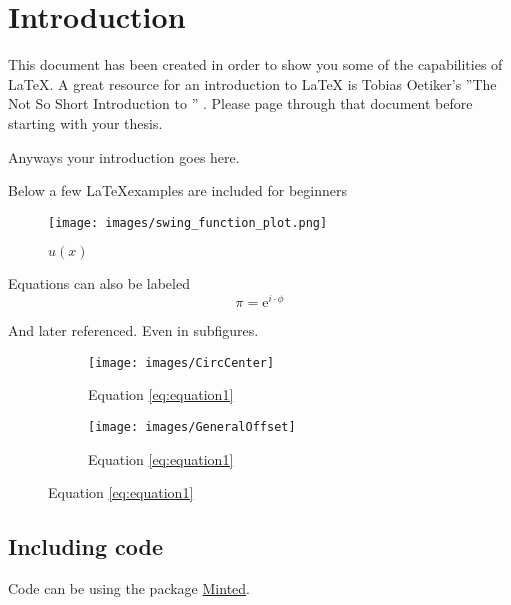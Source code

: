 \chapter{Introduction}
\label{chapter:Introduction}
	This document has been created in order to show you some of the capabilities 
of \LaTeX.  A great resource for an introduction to \LaTeX\xspace is Tobias
Oetiker's ''The Not So Short Introduction to \LaTeXe'' \cite{latex}.  Please
page through that document
before starting with your thesis.
\par
Anyways your introduction goes here.


Below a few \LaTeX examples are included for beginners
\begin{figure}[ht]
  \centering
  \texttt{[image: images/swing\_function\_plot.png]}
  \caption{$u(x)$}%
  \label{fig:swingPlot}
\end{figure}


Equations can also be labeled
\begin{equation}
	\pi = \mathrm{e}^{i\cdot\phi}
	\label{eq:equation1}
\end{equation}


And later referenced. Even in subfigures.
\begin{figure}[!htb]
  \centering
  \begin{subfigure}[b]{0.3\textwidth}
    \centering
  \texttt{[image: images/CircCenter]}
  \caption{Equation \ref{eq:equation1}}\label{fig:circcenter}
\end{subfigure}
\hfill
  \begin{subfigure}[b]{0.3\textwidth}
    \centering
  \texttt{[image: images/GeneralOffset]}
  \label{fig:generaloffset}
  \caption{Equation \ref{eq:equation1}}
\end{subfigure}
\end{figure}
\section{Including code}

Code can be using the package
\href{https://www.sharelatex.com/learn/Code\_Highlighting\_with\_minted}{Minted}.

